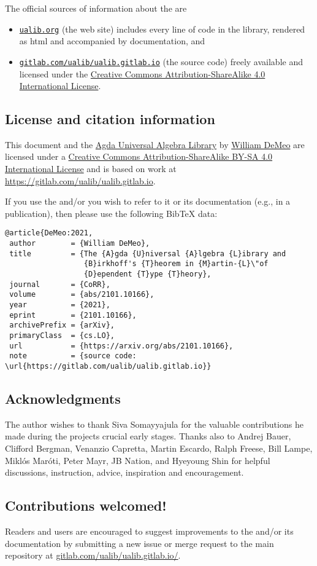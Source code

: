 \noindent The official sources of information about the \agdaualib are
\begin{itemize}
  \item \href{https://ualib.gitlab.io}{\texttt{ualib.org}} (the web site) includes every line of code in the library, rendered as html and accompanied by documentation, and
  \item \href{https://gitlab.com/ualib/ualib.gitlab.io}{\texttt{gitlab.com/ualib/ualib.gitlab.io}} (the source code) freely available and licensed under the \href{https://creativecommons.org/licenses/by-sa/4.0/}{Creative Commons Attribution-ShareAlike 4.0 International License}.
\end{itemize}


\subsection*{License and citation information}
This document and the \href{https://gitlab.com/ualib/ualib.gitlab.io/}{Agda Universal Algebra Library} by \href{mailto:williamdemeo@gmail.com}{William DeMeo} are licensed under a \href{http://creativecommons.org/licenses/by-sa/4.0/}{Creative Commons Attribution-ShareAlike BY-SA 4.0 International License} and is based on work at \url{https://gitlab.com/ualib/ualib.gitlab.io}.

If you use the \agdaualib and/or you wish to refer to it or its documentation (e.g., in a publication), then please use the following BibTeX data:

{\small
\begin{verbatim}
@article{DeMeo:2021,
 author        = {William DeMeo},
 title         = {The {A}gda {U}niversal {A}lgebra {L}ibrary and 
                  {B}irkhoff's {T}heorem in {M}artin-{L}\"of 
                  {D}ependent {T}ype {T}heory}, 
 journal       = {CoRR},
 volume        = {abs/2101.10166},
 year          = {2021},
 eprint        = {2101.10166},
 archivePrefix = {arXiv},
 primaryClass  = {cs.LO},
 url           = {https://arxiv.org/abs/2101.10166},
 note          = {source code: \url{https://gitlab.com/ualib/ualib.gitlab.io}}
\end{verbatim}
}

\subsection*{Acknowledgments}
The author wishes to thank Siva Somayyajula for the valuable contributions he made during the projects crucial early stages. Thanks also to Andrej Bauer, Clifford Bergman, Venanzio Capretta, Martin Escardo, Ralph Freese, Bill Lampe, Miklós Maróti, Peter Mayr, JB Nation, and Hyeyoung Shin for helpful discussions, instruction, advice, inspiration
and encouragement.

\subsection*{Contributions welcomed!}
Readers and users are encouraged to suggest improvements to the \agdaualib and/or its documentation by submitting a new issue or merge request to the main repository at \href{https://gitlab.com/ualib/ualib.gitlab.io/}{gitlab.com/ualib/ualib.gitlab.io/}.

